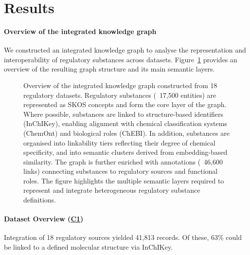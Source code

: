 \section{Results}
\label{sec:results}

\paragraph{Overview of the integrated knowledge graph}
\label{sec:knowledge_graph}

We constructed an integrated knowledge graph to analyse the representation
and interoperability of regulatory substances across datasets.
Figure~\ref{fig:knowledge_graph} provides an overview of the resulting
graph structure and its main semantic layers.

\begin{figure}[!ht]
    \centering
    \caption{
        Overview of the integrated knowledge graph constructed from 18 regulatory datasets.
        Regulatory substances (~17,500 entities) are represented as SKOS concepts
        and form the core layer of the graph.
        Where possible, substances are linked to structure-based identifiers (InChIKey),
        enabling alignment with chemical classification systems (ChemOnt)
        and biological roles (ChEBI).
        In addition, substances are organised into linkability tiers
        reflecting their degree of chemical specificity, and into
        semantic clusters derived from embedding-based similarity.
        The graph is further enriched with annotations (~46,600 links)
        connecting substances to regulatory sources and functional roles.
        The figure highlights the multiple semantic layers
        required to represent and integrate heterogeneous regulatory substance definitions.
    }\label{fig:knowledge_graph}
\end{figure}

\paragraph{Dataset Overview (\texorpdfstring{\hyperref[sec:contribution1]{C1}}{C1})}

Integration of 18 regulatory sources yielded 41,813 records. Of these,
63\% could be linked to a defined molecular structure via InChIKey.


